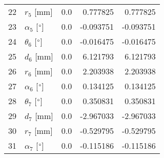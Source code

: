 \documentclass{standalone}%
\begin{document}
\begin{tabular}{llrrr}
22 &              $r_{5}$ [mm] &       0.0 &   0.777825 &   0.777825 \\
23 &  $\alpha_{5}$ [$\degree$] &       0.0 &  -0.093751 &  -0.093751 \\
24 &  $\theta_{6}$ [$\degree$] &       0.0 &  -0.016475 &  -0.016475 \\
25 &              $d_{6}$ [mm] &       0.0 &   6.121793 &   6.121793 \\
26 &              $r_{6}$ [mm] &       0.0 &   2.203938 &   2.203938 \\
27 &  $\alpha_{6}$ [$\degree$] &       0.0 &   0.134125 &   0.134125 \\
28 &  $\theta_{7}$ [$\degree$] &       0.0 &   0.350831 &   0.350831 \\
29 &              $d_{7}$ [mm] &       0.0 &  -2.967033 &  -2.967033 \\
30 &              $r_{7}$ [mm] &       0.0 &  -0.529795 &  -0.529795 \\
31 &  $\alpha_{7}$ [$\degree$] &       0.0 &  -0.115186 &  -0.115186 \\
\bottomrule
\end{tabular}
%
\end{document}
